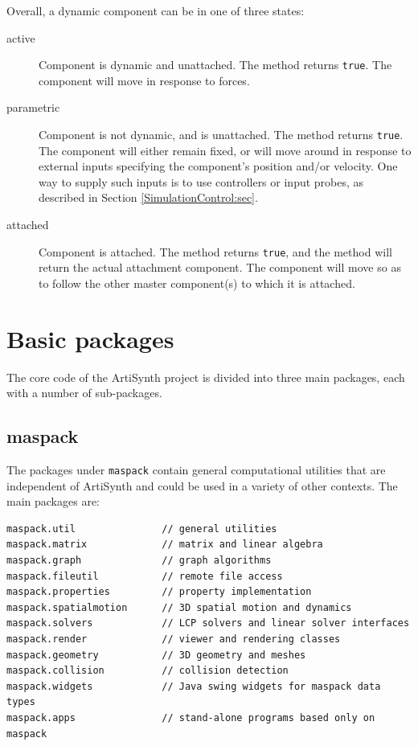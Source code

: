 Overall, a dynamic component can be in one of three states:

\begin{description}

\item[active]\mbox{}

Component is dynamic and unattached. The method
returns {\tt true}. The component will move in response to forces.

\item[parametric]\mbox{}

Component is not dynamic, and is unattached. 
The method
returns {\tt true}.
The component will either remain
fixed, or will move around in response to external inputs specifying
the component's position and/or velocity. One way to supply such
inputs is to use controllers or input probes, as described in
Section \ref{SimulationControl:sec}.

\item[attached]\mbox{}

Component is attached. The method
returns {\tt true}, and the method
will return the actual attachment component. The component will move so as to
follow the other master component(s) to which it is attached.

\end{description}

\section{Basic packages}

The core code of the ArtiSynth project is divided into three main
packages, each with a number of sub-packages.

\subsection{maspack}

The packages under {\tt maspack} contain general computational
utilities that are independent of ArtiSynth and could be
used in a variety of other contexts. The main packages are:

\begin{lstlisting}[]
maspack.util               // general utilities
maspack.matrix             // matrix and linear algebra
maspack.graph              // graph algorithms
maspack.fileutil           // remote file access 
maspack.properties         // property implementation
maspack.spatialmotion      // 3D spatial motion and dynamics
maspack.solvers            // LCP solvers and linear solver interfaces
maspack.render             // viewer and rendering classes
maspack.geometry           // 3D geometry and meshes
maspack.collision          // collision detection
maspack.widgets            // Java swing widgets for maspack data types 
maspack.apps               // stand-alone programs based only on maspack
\end{lstlisting}

